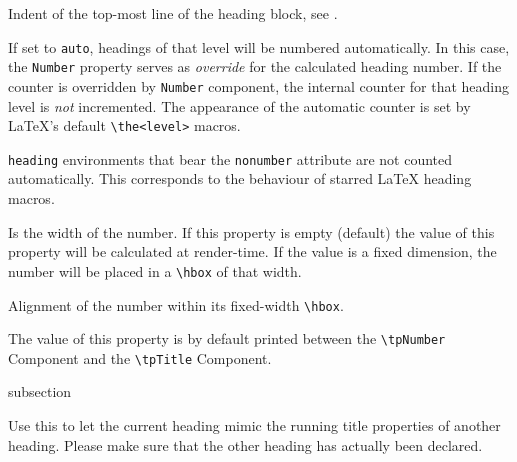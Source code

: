
Indent of the top-most line of the heading block, see .

%

If set to \lstinline{auto}, headings of that level will be numbered
automatically. In this case, the \texttt{Number} property serves as
\textit{override} for the calculated heading number. If the counter is
overridden by \lstinline{Number} component, the internal counter for
that heading level is \textit{not} incremented. The appearance of the
automatic counter is set by \LaTeX's default \lstinline{\the<level>}
macros.

\lstinline{heading} environments that bear the \lstinline{nonumber}
attribute are not counted automatically. This corresponds to the
behaviour of starred {\LaTeX} heading macros.


Is the width of the number. If this property is empty (default) the
value of this property will be calculated at render-time. If the value
is a fixed dimension, the number will be placed in a \lstinline{\hbox}
of that width.


Alignment of the number within its fixed-width \lstinline{\hbox}.

%

The value of this property is by default printed between the
\lstinline{\tpNumber} Component and the \lstinline{\tpTitle}
Component.

\begin{heading}[label=sec:hdg:run]{subsection}
\end{heading}

%

Use this to let the current heading mimic the running title properties
of another heading. Please make sure that the other heading has
actually been declared.


